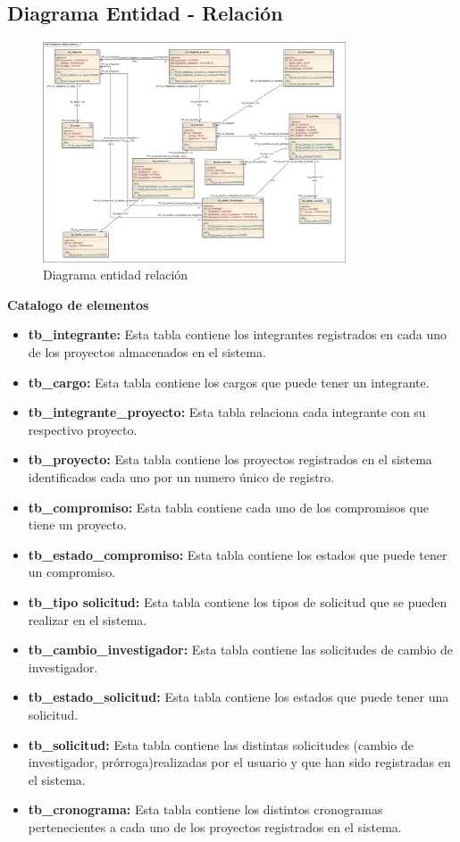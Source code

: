 \documentclass[12pt,oneside,letterpaper]{report}
\begin{document}
\subsection{Diagrama Entidad - Relación}

\begin{figure}[h!]
  \centering
    \includegraphics[width=0.80\textwidth]{./img/img8.png}
  \caption{Diagrama entidad relación}
\end{figure}


\textbf{Catalogo de elementos}\\

\begin{itemize}
 \item \textbf{tb\_integrante:} Esta tabla contiene los integrantes registrados en cada uno de los proyectos almacenados en el sistema.
 \item \textbf{tb\_cargo:} Esta tabla contiene los cargos que puede tener un integrante.
 \item \textbf{tb\_integrante\_proyecto:} Esta tabla relaciona cada integrante con su respectivo proyecto.
 \item \textbf{tb\_proyecto:} Esta tabla contiene los proyectos registrados en el sistema identificados cada uno por un numero único de registro.
 \item \textbf{tb\_compromiso:} Esta tabla contiene cada uno de los compromisos que tiene un proyecto.
 \item \textbf{tb\_estado\_compromiso:} Esta tabla contiene los estados que puede tener un compromiso.
 \item \textbf{tb\_tipo solicitud:} Esta tabla contiene los tipos de solicitud que se pueden realizar en el sistema.
 \item \textbf{tb\_cambio\_investigador:} Esta tabla contiene las solicitudes de cambio de investigador.
 \item \textbf{tb\_estado\_solicitud:} Esta tabla contiene los estados que puede tener una solicitud.
 \item \textbf{tb\_solicitud:} Esta tabla contiene las distintas solicitudes (cambio de investigador, prórroga)realizadas por el usuario y que han sido registradas en el sistema.
 \item \textbf{tb\_cronograma:} Esta tabla contiene los distintos cronogramas pertenecientes a cada uno de los proyectos registrados en el sistema.
\end{itemize}
\end{document}
